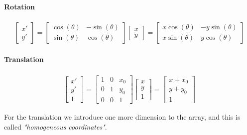 \documentclass{article}
\begin{document}
\paragraph{Rotation}
\begin{align*}
    \left[\begin{array}{c}x'\\y'\end{array}\right] = \left[\begin{array}{cc}\cos(\theta) & -\sin(\theta) \\ \sin(\theta) & \cos(\theta)\end{array}\right]\left[\begin{array}{c}x\\y\end{array}\right] = \left[\begin{array}{cc}x\cos(\theta) & -y\sin(\theta) \\ x\sin(\theta) & y\cos(\theta)\end{array}\right]
\end{align*}

\paragraph{Translation}
\begin{align*}
    \left[\begin{array}{c}x'\\y'\\ 1\end{array}\right] = \left[\begin{array}{ccc}1 & 0 & x_0 \\ 0 & 1 & y_0 \\ 0&0&1\end{array}\right]\left[\begin{array}{c}x\\y\\1\end{array}\right] = \left[\begin{array}{c}x + x_0\\y+y_0\\1\end{array}\right]
\end{align*}

For the translation we introduce one more dimension to the array, and this is called \textit{"homogeneous coordinates"}.
\end{document}
